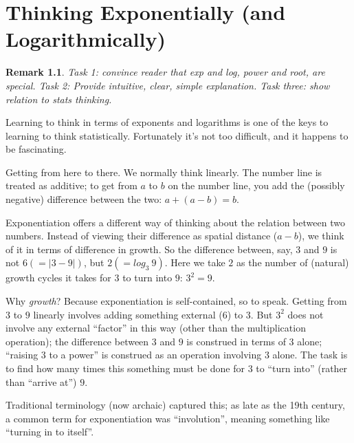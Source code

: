\documentclass[reqno,12pt]{tufte-book}
\numberwithin{equation}{subsection}
\newtheorem{remark}{Remark}
\begin{document}
\chapter{Thinking Exponentially (and Logarithmically)}

\begin{remark}
  Task 1: convince reader that exp and log, power and root, are
  special.  Task 2: Provide intuitive, clear, simple explanation.
  Task three: show relation to stats thinking.
\end{remark}

Learning to think in terms of exponents and logarithms is one of the
keys to learning to think statistically.  Fortunately it's not too
difficult, and it happens to be fascinating.

Getting from here to there.  We normally think linearly.  The number
line is treated as additive; to get from $a$ to $b$ on the number
line, you add the (possibly negative) difference between the two: $a +
(a-b) = b$.

Exponentiation offers a different way of thinking about the relation
between two numbers.  Instead of viewing their difference as spatial
distance ($a-b$), we think of it in terms of difference in growth.  So
the difference between, say, $3$ and $9$ is not $6 (= |3-9|)$, but $2
(= log_3\ 9)$.  Here we take $2$ as the number of (natural) growth
cycles it takes for $3$ to turn into $9$: $3^2 = 9$.

Why \textit{growth}?  Because exponentiation is self-contained, so to
speak.  Getting from $3$ to $9$ linearly involves adding something
external ($6$) to $3$.  But $3^2$ does not involve any external
``factor'' in this way (other than the multiplication operation); the
difference between $3$ and $9$ is construed in terms of $3$ alone;
``raising $3$ to a power'' is construed as an operation involving $3$
alone.  The task is to find how many times this something must be done
for $3$ to ``turn into'' (rather than ``arrive at'') $9$.

Traditional terminology (now archaic) captured this; as late as the
19th century, a common term for exponentiation was ``involution'',
meaning something like ``turning in to itself''.
\end{document}
